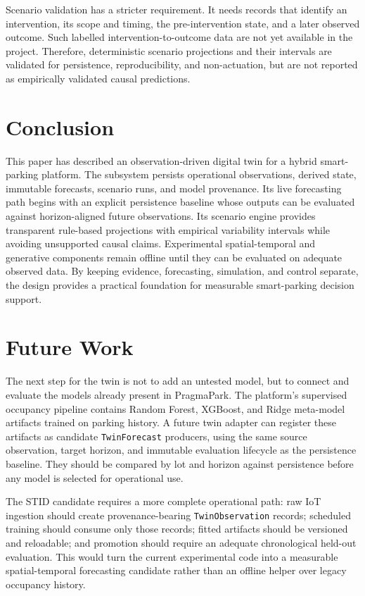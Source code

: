 \documentclass[conference]{IEEEtran}
\begin{document}
Scenario validation has a stricter requirement. It needs records that identify an intervention, its scope and timing, the pre-intervention state, and a later observed outcome. Such labelled intervention-to-outcome data are not yet available in the project. Therefore, deterministic scenario projections and their intervals are validated for persistence, reproducibility, and non-actuation, but are not reported as empirically validated causal predictions.

\section{Conclusion}

This paper has described an observation-driven digital twin for a hybrid smart-parking platform. The subsystem persists operational observations, derived state, immutable forecasts, scenario runs, and model provenance. Its live forecasting path begins with an explicit persistence baseline whose outputs can be evaluated against horizon-aligned future observations. Its scenario engine provides transparent rule-based projections with empirical variability intervals while avoiding unsupported causal claims. Experimental spatial-temporal and generative components remain offline until they can be evaluated on adequate observed data. By keeping evidence, forecasting, simulation, and control separate, the design provides a practical foundation for measurable smart-parking decision support.

\section{Future Work}

The next step for the twin is not to add an untested model, but to connect and evaluate the models already present in PragmaPark. The platform's supervised occupancy pipeline contains Random Forest, XGBoost, and Ridge meta-model artifacts trained on parking history. A future twin adapter can register these artifacts as candidate \texttt{TwinForecast} producers, using the same source observation, target horizon, and immutable evaluation lifecycle as the persistence baseline. They should be compared by lot and horizon against persistence before any model is selected for operational use.

The STID candidate requires a more complete operational path: raw IoT ingestion should create provenance-bearing \texttt{TwinObservation} records; scheduled training should consume only those records; fitted artifacts should be versioned and reloadable; and promotion should require an adequate chronological held-out evaluation. This would turn the current experimental code into a measurable spatial-temporal forecasting candidate rather than an offline helper over legacy occupancy history.
\end{document}
